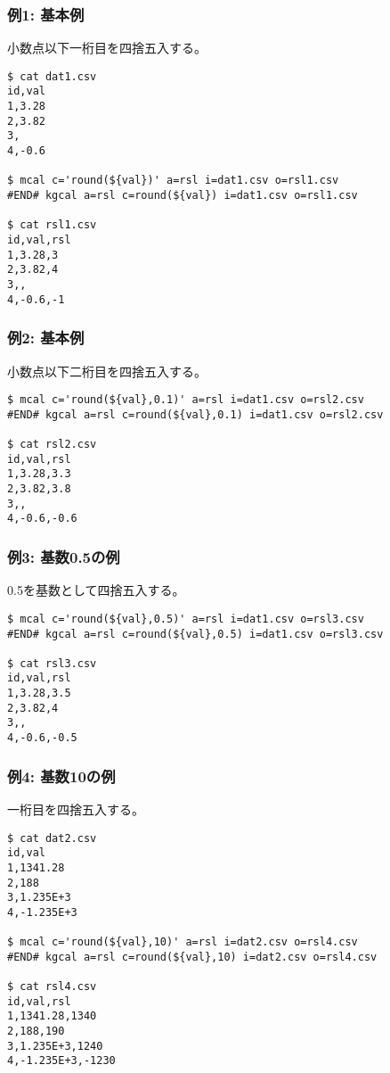 
\subsubsection*{例1: 基本例}

小数点以下一桁目を四捨五入する。

\begin{Verbatim}[baselinestretch=0.7,frame=single]
$ cat dat1.csv
id,val
1,3.28
2,3.82
3,
4,-0.6

$ mcal c='round(${val})' a=rsl i=dat1.csv o=rsl1.csv
#END# kgcal a=rsl c=round(${val}) i=dat1.csv o=rsl1.csv

$ cat rsl1.csv
id,val,rsl
1,3.28,3
2,3.82,4
3,,
4,-0.6,-1
\end{Verbatim}

\subsubsection*{例2: 基本例}

小数点以下二桁目を四捨五入する。

\begin{Verbatim}[baselinestretch=0.7,frame=single]
$ mcal c='round(${val},0.1)' a=rsl i=dat1.csv o=rsl2.csv
#END# kgcal a=rsl c=round(${val},0.1) i=dat1.csv o=rsl2.csv

$ cat rsl2.csv
id,val,rsl
1,3.28,3.3
2,3.82,3.8
3,,
4,-0.6,-0.6
\end{Verbatim}

\subsubsection*{例3: 基数0.5の例}

0.5を基数として四捨五入する。

\begin{Verbatim}[baselinestretch=0.7,frame=single]
$ mcal c='round(${val},0.5)' a=rsl i=dat1.csv o=rsl3.csv
#END# kgcal a=rsl c=round(${val},0.5) i=dat1.csv o=rsl3.csv

$ cat rsl3.csv
id,val,rsl
1,3.28,3.5
2,3.82,4
3,,
4,-0.6,-0.5
\end{Verbatim}

\subsubsection*{例4: 基数10の例}

一桁目を四捨五入する。

\begin{Verbatim}[baselinestretch=0.7,frame=single]
$ cat dat2.csv
id,val
1,1341.28
2,188
3,1.235E+3
4,-1.235E+3

$ mcal c='round(${val},10)' a=rsl i=dat2.csv o=rsl4.csv
#END# kgcal a=rsl c=round(${val},10) i=dat2.csv o=rsl4.csv

$ cat rsl4.csv
id,val,rsl
1,1341.28,1340
2,188,190
3,1.235E+3,1240
4,-1.235E+3,-1230
\end{Verbatim}

